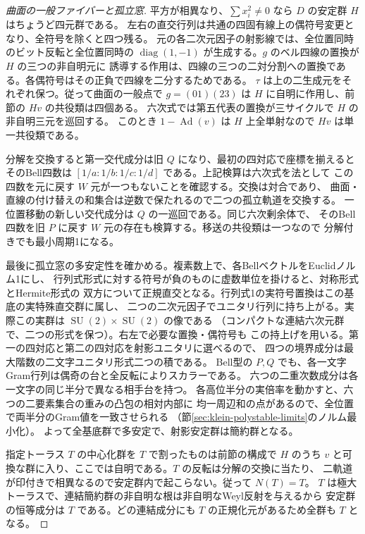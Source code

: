 \begin{proof}[曲面の一般ファイバーと孤立窓]
平方が相異なり、$\sum x_i^2\ne0$ なら $D$ の安定群 $H$ はちょうど四元群である。
左右の直交行列は共通の四固有線上の偶符号変更となり、全符号を除くと四つ残る。
元の各二次元因子の射影線では、全位置同時のビット反転と全位置同時の
$\operatorname{diag}(1,-1)$ が生成する。$g$ のベル四線の置換が $H$ の三つの非自明元に
誘導する作用は、四線の三つの二対分割への置換である。各偶符号はその正負で四線を二分するためである。
$\tau$ は上の二生成元をそれぞれ保つ。従って曲面の一般点で $g=(01)(23)$ は
$H$ に自明に作用し、前節の $Hv$ の共役類は四個ある。
六次式では第五代表の置換が三サイクルで $H$ の非自明三元を巡回する。
このとき $1-\operatorname{Ad}(v)$ は $H$ 上全単射なので $Hv$ は単一共役類である。

分解を交換すると第一交代成分は旧 $Q$ になり、最初の四対応で座標を揃えると
そのBell四数は $[1/a:1/b:1/c:1/d]$ である。上記検算は六次式を法として
この四数を元に戻す $W$ 元が一つもないことを確認する。交換は対合であり、
曲面・直線の付け替えの和集合は逆数で保たれるので二つの孤立軌道を交換する。
一位置移動の新しい交代成分は $Q$ の一巡回である。同じ六次剰余体で、
そのBell四数を旧 $P$ に戻す $W$ 元の存在も検算する。移送の共役類は一つなので
分解付きでも最小周期1になる。

最後に孤立窓の多安定性を確かめる。複素数上で、各BellベクトルをEuclidノルム1にし、
行列式形式に対する符号が負のものに虚数単位を掛けると、対称形式とHermite形式の
双方について正規直交となる。行列式1の実符号置換はこの基底の実特殊直交群に属し、
二つの二次元因子でユニタリ行列に持ち上がる。実際この実群は
$\operatorname{SU}(2)\times\operatorname{SU}(2)$ の像である
（コンパクトな連結六次元群で、二つの形式を保つ）。右左で必要な置換・偶符号も
この持上げを用いる。第一の四対応と第二の四対応を射影ユニタリに選べるので、
四つの境界成分は最大階数の二文字ユニタリ形式二つの積である。
Bell型の $P,Q$ でも、各一文字Gram行列は偶奇の台と全反転によりスカラーである。
六つの二重次数成分は各一文字の同じ半分で異なる相手台を持つ。
各高位半分の実倍率を動かすと、六つの二要素集合の重みの凸包の相対内部に
均一周辺和の点があるので、全位置で両半分のGram値を一致させられる
（節\ref{sec:klein-polystable-limits}のノルム最小化）。
よって全基底群で多安定で、射影安定群は簡約群となる。

指定トーラス $T$ の中心化群を $T$ で割ったものは前節の構成で $H$ のうち
$v$ と可換な群に入り、ここでは自明である。$T$ の反転は分解の交換に当たり、
二軌道が印付きで相異なるので安定群内で起こらない。従って $N(T)=T$。
$T$ は極大トーラスで、連結簡約群の非自明な根は非自明なWeyl反射を与えるから
安定群の恒等成分は $T$ である。どの連結成分にも $T$ の正規化元があるため全群も $T$ となる。
\end{proof}
